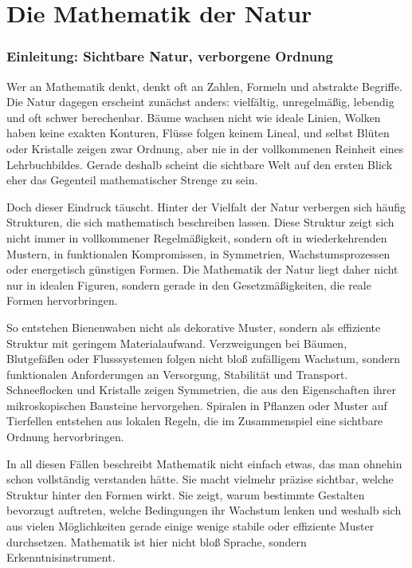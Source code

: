 \chapter{Die Mathematik der Natur}
\label{chap:X_mathematik_der_natur}


\subsection{Einleitung: Sichtbare Natur, verborgene Ordnung}

Wer an Mathematik denkt, denkt oft an Zahlen, Formeln und abstrakte Begriffe.
Die Natur dagegen erscheint zunächst anders:
vielfältig, unregelmäßig, lebendig und oft schwer berechenbar.
Bäume wachsen nicht wie ideale Linien,
Wolken haben keine exakten Konturen,
Flüsse folgen keinem Lineal,
und selbst Blüten oder Kristalle zeigen zwar Ordnung,
aber nie in der vollkommenen Reinheit eines Lehrbuchbildes.
Gerade deshalb scheint die sichtbare Welt auf den ersten Blick
eher das Gegenteil mathematischer Strenge zu sein.

Doch dieser Eindruck täuscht.
Hinter der Vielfalt der Natur verbergen sich häufig Strukturen,
die sich mathematisch beschreiben lassen.
Diese Struktur zeigt sich nicht immer in vollkommener Regelmäßigkeit,
sondern oft in wiederkehrenden Mustern,
in funktionalen Kompromissen,
in Symmetrien,
Wachstumsprozessen
oder energetisch günstigen Formen.
Die Mathematik der Natur liegt daher nicht nur in idealen Figuren,
sondern gerade in den Gesetzmäßigkeiten,
die reale Formen hervorbringen.

So entstehen Bienenwaben nicht als dekorative Muster,
sondern als effiziente Struktur mit geringem Materialaufwand.
Verzweigungen bei Bäumen,
Blutgefäßen oder Flusssystemen
folgen nicht bloß zufälligem Wachstum,
sondern funktionalen Anforderungen an Versorgung,
Stabilität und Transport.
Schneeflocken und Kristalle zeigen Symmetrien,
die aus den Eigenschaften ihrer mikroskopischen Bausteine hervorgehen.
Spiralen in Pflanzen oder Muster auf Tierfellen entstehen aus lokalen Regeln,
die im Zusammenspiel eine sichtbare Ordnung hervorbringen.

In all diesen Fällen beschreibt Mathematik nicht einfach etwas,
das man ohnehin schon vollständig verstanden hätte.
Sie macht vielmehr präzise sichtbar,
welche Struktur hinter den Formen wirkt.
Sie zeigt,
warum bestimmte Gestalten bevorzugt auftreten,
welche Bedingungen ihr Wachstum lenken
und weshalb sich aus vielen Möglichkeiten gerade einige wenige stabile
oder effiziente Muster durchsetzen.
Mathematik ist hier nicht bloß Sprache,
sondern Erkenntnisinstrument.

